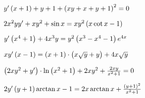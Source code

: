 	\begin{enumtasks}

		\item \( y' \left( x + 1 \right) + y + 1 + \left( xy + x + y + 1 \right)^2 = 0 \)											%
		\item \( 2x^2 yy' + xy^2 + \sin{x} = x y^2 \left( x \cot{x} - 1 \right) \)											%
		\item \( y' \left( x^4 + 1 \right) + 4x^3 y = y^2 \left( x^3 - x^4 - 1 \right) e^{4x} \)									%
		\item \( xy' \left( x - 1 \right) = \left( x + 1 \right) \cdot \left( x \sqrt{y} + y \right) + 4x \sqrt{y} \)					%
		\item \( \left( 2 xy^2 + y' \right) \cdot \ln{ \left( x^2 + 1 \right) } + 2xy^2 + \frac{2xy}{x^2 + 1} = 0 \)				%
		\item \( 2y' \left( y + 1 \right) \arctan{x} - 1 = 2x \arctan{x} + \frac{\left( y + 1 \right)^2}{x^2 + 1} \)				%

	\end{enumtasks}

